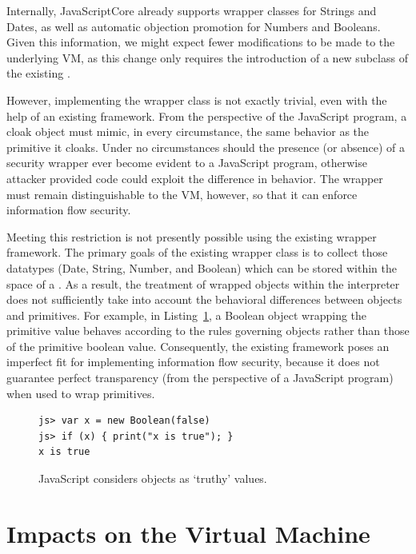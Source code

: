 Internally, JavaScriptCore already supports wrapper classes for Strings and Dates, as well as automatic objection promotion for Numbers and Booleans.
Given this information, we might expect fewer modifications to be made to the underlying VM, as this change only requires the introduction of a new subclass of the existing .

However, implementing the wrapper class is not exactly trivial, even with the help of an existing framework.
From the perspective of the JavaScript program, a cloak object must mimic, in every circumstance, the same behavior as the primitive it cloaks.
Under no circumstances should the presence (or absence) of a security wrapper ever become evident to a JavaScript program, otherwise attacker provided code could exploit the difference in behavior.
The wrapper must remain distinguishable to the VM, however, so that it can enforce information flow security.

Meeting this restriction is not presently possible using the existing wrapper framework.
The primary goals of the existing wrapper class is to collect those datatypes (Date, String, Number, and Boolean) which can be stored within the space of a .
As a result, the treatment of wrapped objects within the interpreter does not sufficiently take into account the behavioral differences between objects and primitives.
For example, in Listing~\ref{list:boolean}, a Boolean object wrapping the primitive value  behaves according to the rules governing objects rather than those of the primitive boolean value.
Consequently, the existing framework poses an imperfect fit for implementing information flow security, because it does not guarantee perfect transparency (from the perspective of a JavaScript program) when used to wrap primitives.

\begin{figure}[h]
\begin{lstlisting}
js> var x = new Boolean(false)
js> if (x) { print("x is true"); }
x is true
\end{lstlisting}
  \caption{JavaScript considers objects as `truthy' values.}
  \label{list:boolean}
\end{figure}

\section{Impacts on the Virtual Machine}
\label{sec:analysis}

